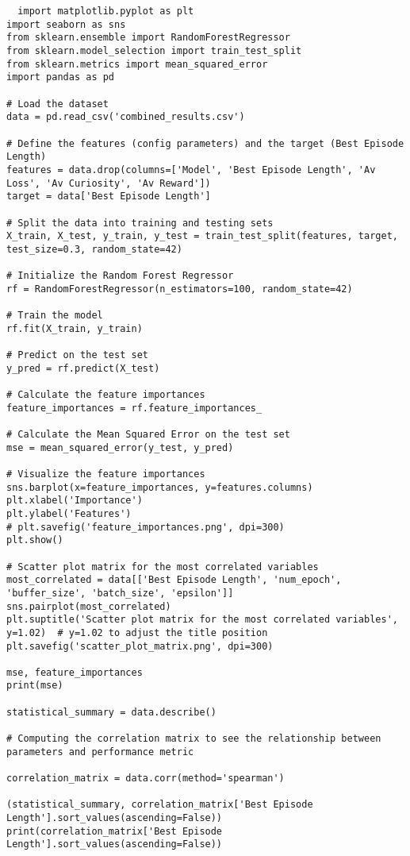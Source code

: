 \begin{lstlisting}
  import matplotlib.pyplot as plt
import seaborn as sns
from sklearn.ensemble import RandomForestRegressor
from sklearn.model_selection import train_test_split
from sklearn.metrics import mean_squared_error
import pandas as pd

# Load the dataset
data = pd.read_csv('combined_results.csv')

# Define the features (config parameters) and the target (Best Episode Length)
features = data.drop(columns=['Model', 'Best Episode Length', 'Av Loss', 'Av Curiosity', 'Av Reward'])
target = data['Best Episode Length']

# Split the data into training and testing sets
X_train, X_test, y_train, y_test = train_test_split(features, target, test_size=0.3, random_state=42)

# Initialize the Random Forest Regressor
rf = RandomForestRegressor(n_estimators=100, random_state=42)

# Train the model
rf.fit(X_train, y_train)

# Predict on the test set
y_pred = rf.predict(X_test)

# Calculate the feature importances
feature_importances = rf.feature_importances_

# Calculate the Mean Squared Error on the test set
mse = mean_squared_error(y_test, y_pred)

# Visualize the feature importances
sns.barplot(x=feature_importances, y=features.columns)
plt.xlabel('Importance')
plt.ylabel('Features')
# plt.savefig('feature_importances.png', dpi=300)
plt.show()

# Scatter plot matrix for the most correlated variables
most_correlated = data[['Best Episode Length', 'num_epoch', 'buffer_size', 'batch_size', 'epsilon']]
sns.pairplot(most_correlated)
plt.suptitle('Scatter plot matrix for the most correlated variables', y=1.02)  # y=1.02 to adjust the title position
plt.savefig('scatter_plot_matrix.png', dpi=300)

mse, feature_importances
print(mse)

statistical_summary = data.describe()

# Computing the correlation matrix to see the relationship between parameters and performance metric

correlation_matrix = data.corr(method='spearman')

(statistical_summary, correlation_matrix['Best Episode Length'].sort_values(ascending=False))
print(correlation_matrix['Best Episode Length'].sort_values(ascending=False))
\end{lstlisting}








\
